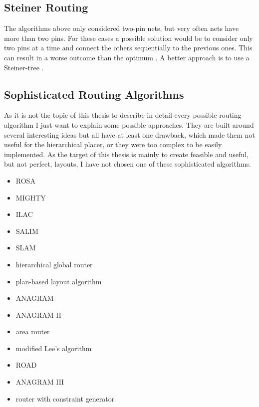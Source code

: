 \subsection{Steiner Routing}
\label{subsec:steiner_routing}
The algorithms above only considered two-pin nets, but very often nets have more than two pins. For these cases a possible solution would be to consider only two pins at a time and connect the others sequentially to the previous ones. This can result in a worse outcome than the optimum \cite[p. 701]{kaufmann:electronic_design_automation}. A better approach is to use a Steiner-tree \cite[page 153]{springer:eda_analog_routing}.

\subsection{Sophisticated Routing Algorithms}
As it is not the topic of this thesis to describe in detail every possible routing algorithm I just want to explain some possible approaches. They are built around several interesting ideas but all have at least one drawback, which made them not useful for the hierarchical placer, or they were too complex to be easily implemented. As the target of this thesis is mainly to create feasible and useful, but not perfect, layouts, I have not chosen one of these sophisticated algorithms.
\begin{itemize}
\item ROSA \cite[page 165]{springer:eda_analog_routing}
\item MIGHTY \cite[page 166]{springer:eda_analog_routing}
\item ILAC \cite[page 167]{springer:eda_analog_routing}
\item SALIM \cite[page 167]{springer:eda_analog_routing}
\item SLAM \cite[page 167]{springer:eda_analog_routing}
\item hierarchical global router \cite[page 168]{springer:eda_analog_routing}
\item plan-based layout algorithm \cite[page 168]{springer:eda_analog_routing}
\item ANAGRAM \cite[page 168]{springer:eda_analog_routing}
\item ANAGRAM II \cite[page 168]{springer:eda_analog_routing}
\item area router \cite[page 168]{springer:eda_analog_routing}
\item modified Lee's algorithm \cite[page 170]{springer:eda_analog_routing}
\item ROAD \cite[page 170]{springer:eda_analog_routing}
\item ANAGRAM III \cite[page 170]{springer:eda_analog_routing}
\item router with constraint generator \cite[page 172]{springer:eda_analog_routing}
\end{itemize}

